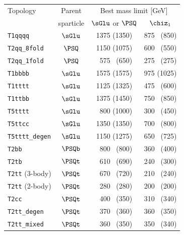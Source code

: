 \newcommand{\ph}{\ensuremath{\phantom{1}}}
\begin{table}[tb]
  \label{tab:simplified-models-limits}
  \centering
  \footnotesize
  \begin{tabular}{ lccc }
    \hline
    Topology               & Parent    & \multicolumn{2}{c}{Best mass limit [GeV]} \\
    \cline{3-4}
                           & sparticle & $\sGlu$ or $\PSQ$ & $\chiz_1$             \\ [0.5ex]
    \hline
    \texttt{T1qqqq}        & $\sGlu$   & 1375 (1350)       & 875 \ph(850)         \\ 
    \texttt{T2qq\_8fold}   & $\PSQ$    & 1150 (1075)       & 600 \ph(550)         \\ 
    \texttt{T2qq\_1fold}   & $\PSQ$    & \ph575  \ph(650)  & 275 \ph(275)         \\ 
    \texttt{T1bbbb}        & $\sGlu$   & 1575 (1575)       & 975 (1025)           \\ 
    \texttt{T1tttt}        & $\sGlu$   & 1125 (1325)       & 475 \ph(600)         \\ 
    \texttt{T1ttbb}        & $\sGlu$   & 1375 (1450)       & 750 \ph(850)         \\ 
    \texttt{T5tttt}        & $\sGlu$   & \ph800  (1000)    & 300 \ph(450)         \\ 
    \texttt{T5ttcc}        & $\sGlu$   & 1350 (1350)       & 700 \ph(800)         \\ 
    \texttt{T5tttt\_degen} & $\sGlu$   & 1150 (1275)       & 650 \ph(725)         \\ 
    \texttt{T2bb}          & $\PSQb$   & \ph800 \ph(800)   & 360 \ph(400)         \\ 
    \texttt{T2tb}          & $\PSQt$   & \ph610 \ph(690)   & 240 \ph(300)         \\ 
    \texttt{T2tt} (3-body) & $\PSQt$   & \ph670 \ph(720)   & 210 \ph(240)         \\
    \texttt{T2tt} (2-body) & $\PSQt$   & \ph280 \ph(280)   & 200 \ph(200)         \\ 
    \texttt{T2cc}          & $\PSQt$   & \ph400 \ph(350)   & 310 \ph(340)         \\ 
    \texttt{T2tt\_degen}   & $\PSQt$   & \ph370 \ph(360)   & 360 \ph(350)         \\ 
    \texttt{T2tt\_mixed}   & $\PSQt$   & \ph360 \ph(350)   & 350 \ph(340)         \\ [0.5ex]
    \hline
  \end{tabular}
\end{table}



